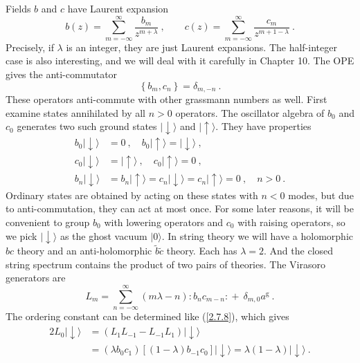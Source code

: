 Fields $b$ and $c$ have Laurent expansion    
\begin{equation} \label{2.7.16}
	b(z)=\sum_{m=-\infty}^{\infty} \frac{b_{m}}{z^{m+\lambda}}\:, \qquad c(z)=\sum_{m=-\infty}^{\infty} \frac{c_{m}}{z^{m+1-\lambda}} \:.
\end{equation}
Precisely, if $\lambda$ is an integer, they are just Laurent expansions. The half-integer case is also interesting, and we will deal with it carefully in Chapter 10. The OPE gives the anti-commutator    
\begin{equation}
	\left\{b_{m}, c_{n}\right\}=\delta_{m,-n} \:.
	\label{2.7.17}
\end{equation}
These operators anti-commute with other grassmann numbers as well. First examine states annihilated by all $n>0$ operators. The oscillator algebra of $b_0$ and $c_0$ generates two such ground states $\lvert\downarrow\rangle$ and $\lvert\uparrow\rangle$. They have properties    
\begin{subequations} \label{2.7.18}
	\begin{align}
		b_{0}\lvert\downarrow\rangle &=0\:, \quad b_{0} \lvert \uparrow\rangle=\lvert\downarrow\rangle \:, \label{2.7.18a} \\
		c_{0}\lvert\downarrow\rangle &=\lvert\uparrow\rangle \:, \quad c_{0}\lvert\uparrow\rangle=0 \:, \label{2.7.18b} \\
		b_{n}\lvert\downarrow\rangle &=b_{n}\lvert\uparrow\rangle=c_{n}\lvert \downarrow\rangle=c_{n}\lvert\uparrow\rangle=0 \:, \quad n>0  \:.
		\label{2.7.18c}
	\end{align}
\end{subequations}
Ordinary states are obtained by acting on these states with $n<0$ modes, but due to anti-commutation, they can act at most once. For some later reasons, it will be convenient to group $b_0$ with lowering operators and $c_0$ with raising operators, so we pick $\lvert \downarrow\rangle$ as the ghost vacuum $|0\rangle$. In string theory we will have a holomorphic $bc$ theory and an anti-holomorphic $\tilde{b} \tilde{c}$ theory. Each has $\lambda=2$.     
And the closed string spectrum contains the product of two pairs of theories.    
The Virasoro generators are    
\begin{equation}
	L_{m}=\sum_{n=-\infty}^{\infty}(m \lambda-n) \mathrel{ : b_{n} c_{m-n} : }+ \:\delta_{m, 0} a^{\mathrm{g}} \:.
	\label{2.7.19}
\end{equation}
The ordering constant can be determined like (\ref{2.7.8}), which gives    
\begin{align}
	2 L_{0}\lvert \downarrow\rangle &= (L_{1} L_{-1}-L_{-1} L_{1}) \lvert \downarrow\rangle \nonumber \\
	&= (\lambda b_{0} c_{1})[(1-\lambda) b_{-1} c_{0}]\lvert \downarrow\rangle=\lambda(1-\lambda)\lvert \downarrow\rangle \:.
	\label{2.7.20}
\end{align}
